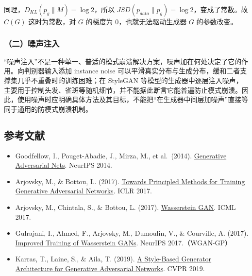 同理，\(D_{KL}(p_g\parallel M)=\log 2\)，所以 \(JSD(p_{data}\parallel p_g)=\log 2\)，变成了常数。故 \(C(G)\) 这时为常数，对 \(G\) 的梯度为 0，也就无法驱动生成器 \(G\) 的参数改变。

\hypertarget{ux4e8cux566aux58f0ux6ce8ux5165}{%
\subsubsection{（二）噪声注入}\label{ux4e8cux566aux58f0ux6ce8ux5165}}

``噪声注入''不是一种单一、普适的模式崩溃解决方案，噪声加在何处决定了它的作用。向判别器输入添加 instance noise 可以平滑真实分布与生成分布，缓和二者支撑集几乎不重叠时的训练困难；在 StyleGAN 等模型的生成器中逐层注入噪声，主要用于控制头发、雀斑等随机细节，并不能据此断言它能普遍防止模式崩溃。因此，使用噪声时应明确具体方法及其目标，不能把``在生成器中间层加噪声''直接等同于通用的防模式崩溃机制。

\hypertarget{ux53c2ux8003ux6587ux732e-39}{%
\subsection{参考文献}\label{ux53c2ux8003ux6587ux732e-39}}

\vspace{0.25em}
\begin{itemize}
\tightlist
\item
  Goodfellow, I., Pouget-Abadie, J., Mirza, M., et al.~(2014). \href{https://papers.nips.cc/paper/5423-generative-adversarial-nets}{Generative Adversarial Nets}. NeurIPS 2014.
\item
  Arjovsky, M., \& Bottou, L. (2017). \href{https://arxiv.org/abs/1701.04862}{Towards Principled Methods for Training Generative Adversarial Networks}. ICLR 2017.
\item
  Arjovsky, M., Chintala, S., \& Bottou, L. (2017). \href{https://arxiv.org/abs/1701.07875}{Wasserstein GAN}. ICML 2017.
\item
  Gulrajani, I., Ahmed, F., Arjovsky, M., Dumoulin, V., \& Courville, A. (2017). \href{https://proceedings.neurips.cc/paper/2017/hash/892c3b1c6dccd52936e27cbd0ff683d6-Abstract.html}{Improved Training of Wasserstein GANs}. NeurIPS 2017.（WGAN-GP）
\item
  Karras, T., Laine, S., \& Aila, T. (2019). \href{https://openaccess.thecvf.com/content_CVPR_2019/html/Karras_A_Style-Based_Generator_Architecture_for_Generative_Adversarial_Networks_CVPR_2019_paper.html}{A Style-Based Generator Architecture for Generative Adversarial Networks}. CVPR 2019.
\end{itemize}

